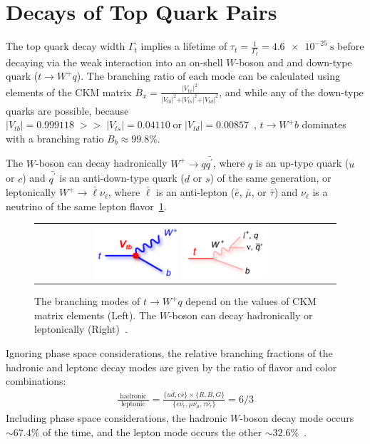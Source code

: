 \section{Decays of Top Quark Pairs}
The top quark decay width $\Gamma_t$ implies a lifetime of $\tau_t = \frac{1}{\Gamma_t}=\SI{4.6e-25}{\s}$ before decaying via the weak interaction into an on-shell $W$-boson and and down-type quark ($t \rightarrow W^+ q$).
The branching ratio of each mode can be calculated using elements of the CKM matrix $B_x = \frac{\vert V_{tx} \vert^2}{\vert V_{tb} \vert^2 + \vert V_{ts} \vert^2 + \vert V_{td} \vert^2}$, and while any of the down-type quarks are possible, because $\vert V_{tb} \vert = 0.999118 \; >> \; \vert V_{ts} \vert = 0.04110 \; \text{or} \; \vert V_{td} \vert = 0.00857$~\cite{bib:PDG}, $t \rightarrow W^+ b$ dominates with a branching ratio $ B_b \approx 99.8\%$.

The $W$-boson can decay hadronically $W^+ \rightarrow q \bar{q^\prime}$, where $q$ is an up-type quark ($u$ or $c$) and $\bar{q^\prime}$ is an anti-down-type quark ($d$ or $s$) of the same generation, or leptonically $W^+ \rightarrow \bar{\ell} \nu_\ell$, where $\bar{\ell}$ is an anti-lepton ($\bar{e}$, $\bar{\mu}$, or $\bar{\tau}$) and $\nu_\ell$ is a neutrino of the same lepton flavor~\ref{t_decay}.
\begin{figure}[!h]
  \begin{center}
    \begin{tabular}{cc}
        \includegraphics[width=0.30\textwidth]{fig_TopQuark/feynman_t_decay_Vtb_blue.png}
        \includegraphics[width=0.30\textwidth]{fig_TopQuark/feynman_t_decay_ljetsqq_pink.png}
    \end{tabular}
    \caption{The branching modes of $t \rightarrow W^+ q$ depend on the values of CKM matrix elements (Left).
             The $W$-boson can decay hadronically or leptonically (Right)~\cite{d0_diagrams}.
    }
    \label{t_decay}
  \end{center}
\end{figure}
Ignoring phase space considerations, the relative branching fractions of the hadronic and leptonc decay modes are given by the ratio of flavor and color combinations:
\begin{align}
\frac{\text { hadronic }}{\text { leptonic }}=\frac{\{u \bar{d}, c \bar{s} \} \times \{R, B, G\}}{\{e \bar{\nu_e}, \mu \bar{\nu_\mu}, \tau \bar{\nu_\tau} \}}=6 / 3
\end{align}
Including phase space considerations, the hadronic $W$-boson decay mode occurs $\sim 67.4 \%$ of the time, and the lepton mode occurs the other $\sim 32.6 \%$~\cite{bib:PDG}.

